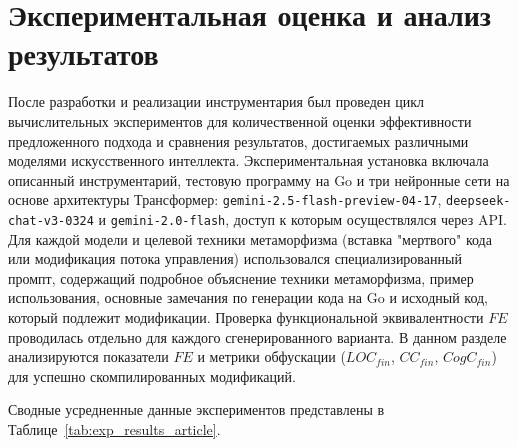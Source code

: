 \section{Экспериментальная оценка и анализ результатов}

После разработки и реализации инструментария был проведен цикл вычислительных экспериментов для количественной оценки эффективности предложенного подхода и сравнения результатов, достигаемых различными моделями искусственного интеллекта. Экспериментальная установка включала описанный инструментарий, тестовую программу на Go и три нейронные сети на основе архитектуры Трансформер: \texttt{gemini-2.5-flash-preview-04-17}, \texttt{deepseek-chat-v3-0324} и \texttt{gemini-2.0-flash}, доступ к которым осуществлялся через API. Для каждой модели и целевой техники метаморфизма (вставка "мертвого" кода или модификация потока управления) использовался специализированный промпт, содержащий подробное объяснение техники метаморфизма, пример использования, основные замечания по генерации кода на Go и исходный код, который подлежит модификации. Проверка функциональной эквивалентности $FE$ проводилась отдельно для каждого сгенерированного варианта. В данном разделе анализируются показатели $FE$ и метрики обфускации ($LOC_{fin}$, $CC_{fin}$, $CogC_{fin}$) для успешно скомпилированных модификаций.

Сводные усредненные данные экспериментов представлены в Таблице~\ref{tab:exp_results_article}.

